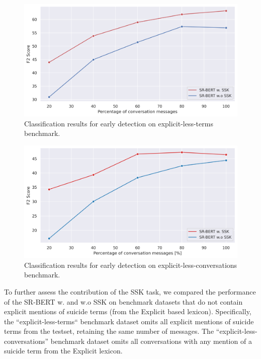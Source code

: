 \documentclass[letterpaper]{article} %
\begin{document}
\begin{figure}[h]
\centering
\includegraphics[width=1.04\columnwidth]{figures/explict_F2.png} 
\caption{Classification results for early detection on explicit-less-terms benchmark.}
\label{fig:explicit-less-terms} 
\end{figure}

\begin{figure}[h]
\centering
\includegraphics[width=1.04\columnwidth]{figures/explicit_conv_F2.png} 
\caption{Classification results for early detection on explicit-less-conversations benchmark.}
\label{fig:explicit-less-conversations} 
\end{figure}


To further assess the contribution of the SSK task, we compared the performance of the SR-BERT w. and w.o SSK on benchmark datasets that do not contain explicit mentions of suicide terms (from the Explicit based lexicon). Specifically, the ``explicit-less-terms`` benchmark dataset omits all explicit mentions of suicide terms from the testset, retaining the same number of messages. 
The ``explicit-less-conversations'' benchmark dataset omits all conversations with any mention of a suicide term from the Explicit lexicon. 
\end{document}
